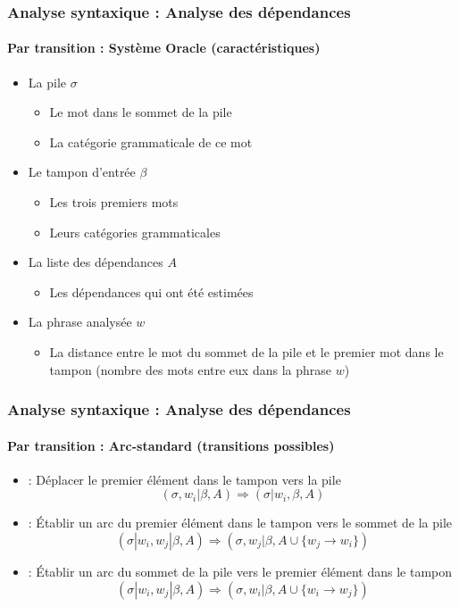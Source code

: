 \documentclass[xcolor=table]{beamer}
\begin{document}
\begin{frame}
\frametitle{Analyse syntaxique : Analyse des dépendances}
\framesubtitle{Par transition : Système Oracle (caractéristiques)}

\begin{itemize}
	\item La pile $\sigma$
	\begin{itemize}
		\item Le mot dans le sommet de la pile
		\item La catégorie grammaticale de ce mot
	\end{itemize}

	\item Le tampon d'entrée $\beta$
	\begin{itemize}
		\item Les trois premiers mots
		\item Leurs catégories grammaticales
	\end{itemize}

	\item La liste des dépendances $A$
	\begin{itemize}
		\item Les dépendances qui ont été estimées
	\end{itemize}

	\item La phrase analysée $w$
	\begin{itemize}
		\item La distance entre le mot du sommet de la pile et le premier mot dans le tampon (nombre des mots entre eux dans la phrase $w$)
	\end{itemize}

\end{itemize}

\end{frame}

\begin{frame}
\frametitle{Analyse syntaxique : Analyse des dépendances}
\framesubtitle{Par transition : Arc-standard (transitions possibles)}

\begin{itemize}
	\item {} : Déplacer le premier élément dans le tampon vers la pile 
	\[ (\sigma, w_i|\beta, A) \Rightarrow  (\sigma|w_i, \beta, A) \]
	
	\item {} : Établir un arc du premier élément dans le tampon vers le sommet de la pile
	\[ (\sigma|w_i, w_j|\beta, A) \Rightarrow  (\sigma, w_j|\beta, A \cup \{w_j \rightarrow w_i \}) \] 
	
	\item {} : Établir un arc du sommet de la pile vers le premier élément dans le tampon
	\[ (\sigma|w_i, w_j|\beta, A) \Rightarrow  (\sigma, w_i|\beta, A \cup \{w_i \rightarrow w_j \}) \] 
\end{itemize}

\end{frame}
\end{document}
